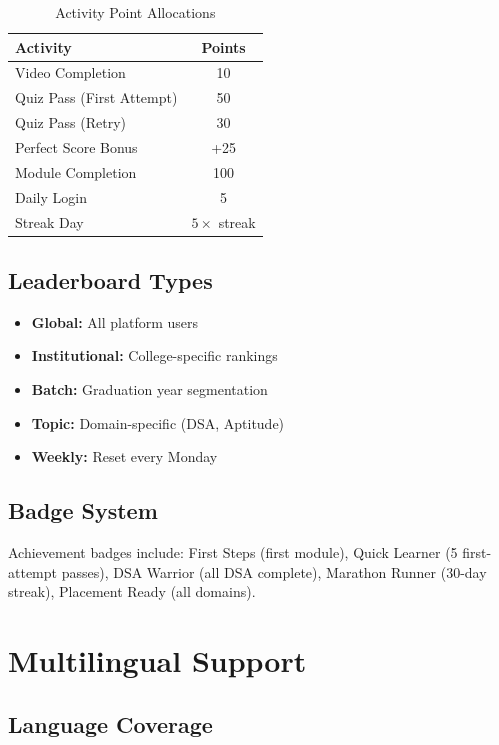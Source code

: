 \documentclass[conference]{IEEEtran}
\begin{document}
\begin{table}[htbp]
\caption{Activity Point Allocations}
\label{tab:points}
\centering
\begin{tabular}{lc}
\toprule
\textbf{Activity} & \textbf{Points} \\
\midrule
Video Completion & 10 \\
Quiz Pass (First Attempt) & 50 \\
Quiz Pass (Retry) & 30 \\
Perfect Score Bonus & +25 \\
Module Completion & 100 \\
Daily Login & 5 \\
Streak Day & $5 \times$ streak \\
\bottomrule
\end{tabular}
\end{table}

\subsection{Leaderboard Types}

\begin{itemize}
    \item \textbf{Global:} All platform users
    \item \textbf{Institutional:} College-specific rankings
    \item \textbf{Batch:} Graduation year segmentation
    \item \textbf{Topic:} Domain-specific (DSA, Aptitude)
    \item \textbf{Weekly:} Reset every Monday
\end{itemize}

\subsection{Badge System}

Achievement badges include: First Steps (first module), Quick Learner (5 first-attempt passes), DSA Warrior (all DSA complete), Marathon Runner (30-day streak), Placement Ready (all domains).

\section{Multilingual Support}

\subsection{Language Coverage}
\end{document}
